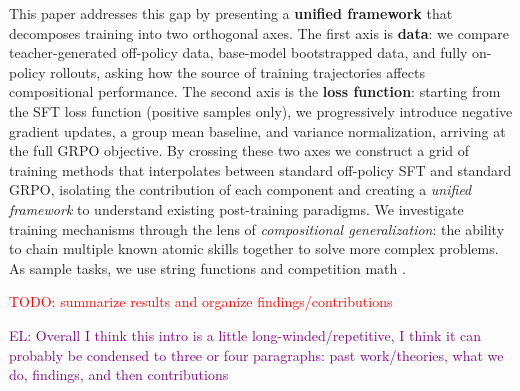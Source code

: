 \documentclass{article}
\newcommand{\todo}[1]{\textcolor{red}{TODO: #1}}
\newcommand{\el}[1]{\textcolor{purple}{EL: #1}}
\begin{document}
This paper addresses this gap by presenting a \textbf{unified framework} that decomposes training into two orthogonal axes. The first axis is \textbf{data}: we compare teacher-generated off-policy data, base-model bootstrapped data, and fully on-policy rollouts, asking how the source of training trajectories affects compositional performance. The second axis is the \textbf{loss function}: starting from the SFT loss function (positive samples only), we progressively introduce negative gradient updates, a group mean baseline, and variance normalization, arriving at the full GRPO objective. By crossing these two axes we construct a grid of training methods that interpolates between standard off-policy SFT and standard GRPO, isolating the contribution of each component and creating a \emph{unified framework} to understand existing post-training paradigms. 
We investigate training mechanisms through the lens of \emph{compositional generalization}: the ability to chain multiple known atomic skills together to solve more complex problems. As sample tasks, we use string functions \citep{yuanLLMsLearnNewSkills2025} and competition math \citep{deepscaler2025}.



\todo{summarize results and organize findings/contributions}


\el{Overall I think this intro is a little long-winded/repetitive, I think it can probably be condensed to three or four paragraphs: past work/theories, what we do, findings, and then contributions}
\end{document}
